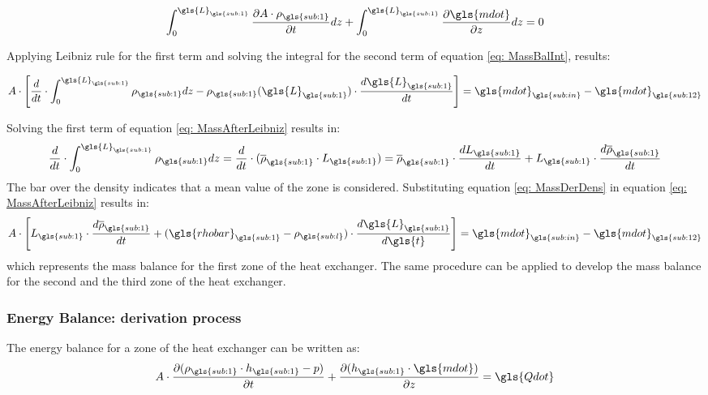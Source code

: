 \documentclass[11pt]{article} %
\begin{document}
\begin{equation}
\int_{0}^{\gls{L}_{\gls{sub:1}}}  \frac{\partial A \cdot \rho_{\gls{sub:1}} }{\partial t} dz + \int_{0}^{\gls{L}_{\gls{sub:1}}} \frac{\partial \gls{mdot}}{\partial z} dz= 0
\label{eq: MassBalInt}
\end{equation}

Applying Leibniz rule for the first term and solving the integral for the second term of equation \ref{eq: MassBalInt}, results:

\begin{equation}
A \cdot \left[  \frac{d}{dt} \cdot \int_{0}^{\gls{L}_{\gls{sub:1}}} \rho_{\gls{sub:1}} dz - \rho_{\gls{sub:1}}(\gls{L}_{\gls{sub:1}}) \cdot \frac{d\gls{L}_{\gls{sub:1}}}{dt} \right] = \gls{mdot}_{\gls{sub:in}} - \gls{mdot}_{\gls{sub:12}}
\label{eq: MassAfterLeibniz}
\end{equation}

Solving the  first term of equation \ref{eq: MassAfterLeibniz} results in:
\begin{equation}
 \frac{d}{dt} \cdot \int_{0}^{\gls{L}_{\gls{sub:1}}} \rho_{\gls{sub:1}} dz =  \frac{d}{dt} \cdot (\overline{\rho}_{\gls{sub:1}} \cdot L_{\gls{sub:1}}) = \overline{\rho}_{\gls{sub:1}} \cdot \frac{dL_{\gls{sub:1}}}{dt} + L_{\gls{sub:1}} \cdot \frac{d\overline{\rho}_{\gls{sub:1}}}{dt}
\label{eq: MassDerDens}
\end{equation}
The bar over the density indicates that a mean value of the zone is considered. Substituting equation \ref{eq: MassDerDens} in equation \ref{eq: MassAfterLeibniz} results in:
\begin{equation}
A \cdot \left[ L_{\gls{sub:1}} \cdot \frac{d\overline{\rho}_{\gls{sub:1}}}{dt}  + (\gls{rhobar}_{\gls{sub:1}} - \rho_{\gls{sub:l}}) \cdot \frac{d \gls{L}_{\gls{sub:1}}}{d \gls{t}}\right] = \gls{mdot}_{\gls{sub:in}} -  \gls{mdot}_{\gls{sub:12}}
\end{equation}
which represents the mass balance for the first zone of the heat exchanger. The same procedure can be applied to develop the mass balance for the second and the third zone of the heat exchanger.

\subsubsection{Energy Balance: derivation process}
The energy balance for a zone of the heat exchanger can be written as:
\begin{equation}
A \cdot \frac{\partial(\rho_{\gls{sub:1}} \cdot h_{\gls{sub:1}} - p)}{\partial t} + \frac{\partial ( h_{\gls{sub:1}} \cdot \gls{mdot})}{\partial z} = \gls{Qdot}
\label{eq: EnergyBalance}
\end{equation}
\end{document}
